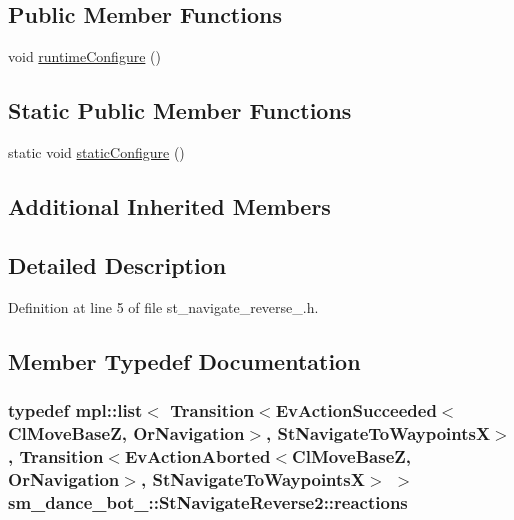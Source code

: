 \subsection*{Public Member Functions}
\begin{DoxyCompactItemize}
\item 
void \hyperlink{structsm__dance__bot__3_1_1StNavigateReverse2_afb6ae94b68b5560e7a48f24e8acc0d55}{runtime\+Configure} ()
\end{DoxyCompactItemize}
\subsection*{Static Public Member Functions}
\begin{DoxyCompactItemize}
\item 
static void \hyperlink{structsm__dance__bot__3_1_1StNavigateReverse2_aa40553f171a92c75e24be7668dfc16d6}{static\+Configure} ()
\end{DoxyCompactItemize}
\subsection*{Additional Inherited Members}


\subsection{Detailed Description}


Definition at line 5 of file st\+\_\+navigate\+\_\+reverse\+\_.\+h.



\subsection{Member Typedef Documentation}
\subsubsection[{\texorpdfstring{reactions}{reactions}}]{\setlength{\rightskip}{0pt plus 5cm}typedef mpl\+::list$<$ Transition$<$Ev\+Action\+Succeeded$<${\bf Cl\+Move\+BaseZ}, {\bf Or\+Navigation}$>$, {\bf St\+Navigate\+To\+WaypointsX}$>$, Transition$<$Ev\+Action\+Aborted$<${\bf Cl\+Move\+BaseZ}, {\bf Or\+Navigation}$>$, {\bf St\+Navigate\+To\+WaypointsX}$>$ $>$ {\bf sm\+\_\+dance\+\_\+bot\+\_\+::\+St\+Navigate\+Reverse2\+::reactions}}\hypertarget{structsm__dance__bot__3_1_1StNavigateReverse2_af67c193b37854515a77146f8ec58ed8c}{}\label{structsm__dance__bot__3_1_1StNavigateReverse2_af67c193b37854515a77146f8ec58ed8c}


